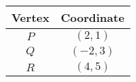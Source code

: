 \begin{tabular}{|c|c|}
    \hline
      \textbf{Vertex}   &  \textbf{Coordinate}\\
    \hline
       $P$  & $(2, 1)$\\
    \hline
        $Q$ & $(-2, 3)$\\
    \hline
        $R$ & $(4, 5)$\\
    \hline
\end{tabular}
